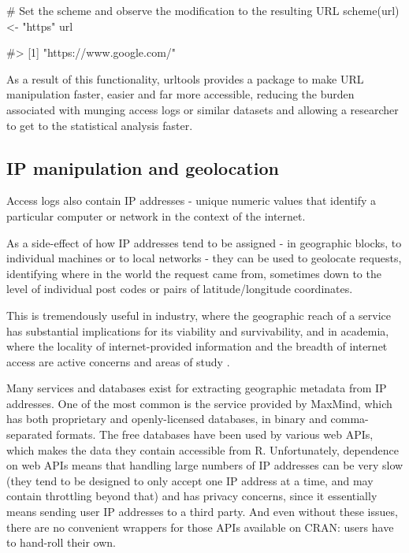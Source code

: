 \begin{Schunk}
\begin{Sinput}
# Set the scheme and observe the modification to the resulting URL
scheme(url) <- "https"
url
\end{Sinput}
\begin{Soutput}
#> [1] "https://www.google.com/"
\end{Soutput}
\end{Schunk}

As a result of this functionality, urltools provides a package to make
URL manipulation faster, easier and far more accessible, reducing the
burden associated with munging access logs or similar datasets and
allowing a researcher to get to the statistical analysis faster.

\subsection{IP manipulation and
geolocation}\label{ip-manipulation-and-geolocation}

Access logs also contain IP addresses - unique numeric values that
identify a particular computer or network in the context of the
internet.

As a side-effect of how IP addresses tend to be assigned - in geographic
blocks, to individual machines or to local networks - they can be used
to geolocate requests, identifying where in the world the request came
from, sometimes down to the level of individual post codes or pairs of
latitude/longitude coordinates.

This is tremendously useful in industry, where the geographic reach of a
service has substantial implications for its viability and
survivability, and in academia, where the locality of internet-provided
information and the breadth of internet access are active concerns and
areas of study \citep{barriers}.

Many services and databases exist for extracting geographic metadata
from IP addresses. One of the most common is the service provided by
MaxMind, which has both proprietary and openly-licensed databases, in
binary and comma-separated formats. The free databases have been used by
various web APIs, which makes the data they contain accessible from R.
Unfortunately, dependence on web APIs means that handling large numbers
of IP addresses can be very slow (they tend to be designed to only
accept one IP address at a time, and may contain throttling beyond that)
and has privacy concerns, since it essentially means sending user IP
addresses to a third party. And even without these issues, there are no
convenient wrappers for those APIs available on CRAN: users have to
hand-roll their own.

